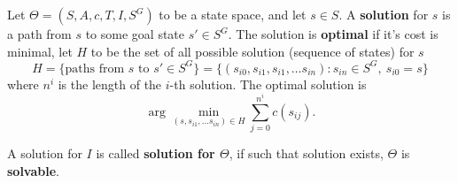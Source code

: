 \documentclass[10pt, letterpaper]{report}
\begin{document}
\begin{definition}
    Let $\Theta=(S,A,c,T,I,S^G)$ to be a state space, and let $s\in S$. A \textbf{solution} for $s$ is a path from $s$ to some goal state $s'\in S^G$. The solution is \textbf{optimal} if it's cost is minimal, let $H$ to be the set of all possible solution (sequence of states) for $s$\begin{equation}
        H=\{\text{paths from }s\text{ to }s'\in S^G\}=\{(s_{i0},s_{i1},s_{i1},\dots s_{in})  : s_{in}\in S^G, \ s_{i0}=s\}
    \end{equation}
    where $n^i$ is the length of the $i$-th solution.
    The optimal solution is\begin{equation}
        \arg \min_{(s,s_{i1},\dots s_{in})\in H}\sum_{j=0}^{n^i} c(s_{ij}).
    \end{equation}
\end{definition}
A solution for $I$ is called \textbf{solution for $\Theta$}, if such that solution exists, $\Theta$ is \textbf{solvable}.
\end{document}
